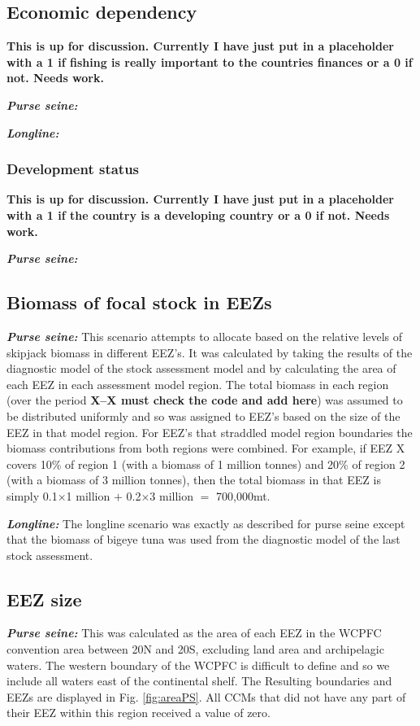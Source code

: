 \documentclass[11pt]{article}
\begin{document}
\subsection*{Economic dependency}
{\bf This is up for discussion. Currently I have just put in a placeholder with a 1 if fishing is really important to the countries finances or a 0 if not. Needs work.}

\noindent\textbf{\emph{Purse seine:}}

\noindent\textbf{\emph{Longline:}}

\subsubsection*{Development status}
{\bf This is up for discussion. Currently I have just put in a placeholder with a 1 if the country is a developing country or a 0 if not. Needs work.}

\noindent\textbf{\emph{Purse seine:}}

\subsection*{Biomass of focal stock in EEZs}
\noindent\textbf{\emph{Purse seine:}}
This scenario attempts to allocate based on the relative levels of skipjack biomass in different EEZ's. It was calculated by taking the results of the diagnostic model of the stock assessment model and by calculating the area of each EEZ in each assessment model region. The total biomass in each region (over the period {\bf X--X must check the code and add here}) was assumed to be distributed uniformly and so was assigned to EEZ's based on the size of the EEZ in that model region. For EEZ's that straddled model region boundaries the biomass contributions from both regions were combined. For example, if EEZ X covers 10\% of region 1 (with a biomass of 1 million tonnes) and 20\% of region 2 (with a biomass of 3 million tonnes), then the total biomass in that EEZ is simply 0.1$\times$1 million $+$ 0.2$\times$3 million $=$ 700,000mt.

\noindent\textbf{\emph{Longline:}}
The longline scenario was exactly as described for purse seine except that the biomass of bigeye tuna was used from the diagnostic model of the last stock assessment.

\subsection*{EEZ size}
\noindent\textbf{\emph{Purse seine:}}
This was calculated as the area of each EEZ in the WCPFC convention area between 20\degree N and 20\degree S, excluding land area and archipelagic waters. The western boundary of the WCPFC is difficult to define and so we include all waters east of the continental shelf. The Resulting boundaries and EEZs are displayed in Fig. \ref{fig:areaPS}. All CCMs that did not have any part of their EEZ within this region received a value of zero.
\end{document}
